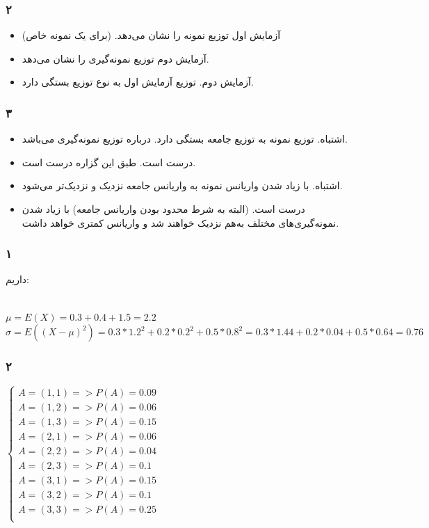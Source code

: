 \documentclass[12pt]{article}
\begin{document}
\begin{itemize}
\begin{itemize}
\end{itemize}
\subsubsection{۲}
\begin{itemize}
	\item 
	آزمایش اول توزیع نمونه را نشان می‌دهد. (برای یک نمونه خاص)
	\item 
	آزمایش دوم توزیع نمونه‌گیری را نشان می‌دهد.
	\item 
	آزمایش دوم. توزیع آزمایش اول به نوع توزیع بستگی دارد.
\end{itemize}
\subsubsection{۳}
\begin{itemize}
	\item 
	اشتباه. توزیع نمونه به توزیع جامعه بستگی دارد. 
	درباره توزیع نمونه‌گیری می‌باشد.
	\item 
	درست است. طبق 
	این گزاره درست است.
	\item 
	اشتباه. با زیاد شدن 
	واریانس نمونه به واریانس جامعه نزدیک و نزدیک‌تر می‌شود.
	\item 
	درست است. (البته به شرط محدود بودن واریانس جامعه) با زیاد شدن 
	نمونه‌گیری‌های مختلف به‌هم نزدیک خواهند شد و واریانس کمتری خواهد داشت.
\end{itemize}
\subsubsection{۱}
داریم:
\begin{latin}
	~\\
	$
	\mu = E(X) = 0.3 + 0.4 + 1.5 = 2.2
	$
	\\
	$
	\sigma = E((X - \mu)^2) = 0.3 * 1.2^2 + 0.2 * 0.2^2 + 0.5 * 0.8^2 
	 = 0.3 * 1.44 + 0.2 * 0.04 + 0.5 * 0.64 = 0.76
	$
\end{latin}
\subsubsection{۲}
\begin{latin}
	$
		 \begin{cases}
		A = (1, 1) => P(A) = 0.09 \\
		A = (1, 2) => P(A) = 0.06 \\
		A = (1, 3) => P(A) = 0.15 \\
		A = (2, 1) => P(A) = 0.06 \\
		A = (2, 2) => P(A) = 0.04 \\
		A = (2, 3) => P(A) = 0.1 \\
		A = (3, 1) => P(A) = 0.15 \\
		A = (3, 2) => P(A) = 0.1 \\
		A = (3, 3) => P(A) = 0.25 \\
	\end{cases}
	$
\end{latin}

\end{itemize}
\end{document}
